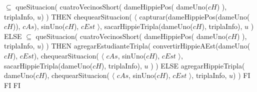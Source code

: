 \documentclass[8pt, a4paper]{article}
\begin{document}
\begin{tad}{}
{			{ $\subseteq$ queSituacion( cuatroVecinosShort( dameHippiePos( dameUno($cH$) ), triplaInfo, $u$) ) 
				THEN 
					chequearSituacion( 
						$\langle$ 
							capturar(dameHippiePos(dameUno($cH$)), $cAs$), 
							sinUno($cH$), 
							$cEst$ 
						$\rangle$, 
						sacarHippieTripla(dameUno($cH$), triplaInfo), 
						$u$
					)
				ELSE
					{ $\subseteq$ queSituacion( cuatroVecinosShort( dameHippiePos( dameUno($cH$) ), triplaInfo, $u$) ) 
						THEN
							agregarEstudianteTripla(
								convertirHippieAEst(dameUno($cH$), $cEst$), 
								chequearSituacion( 
									$\langle$ 
										$cAs$, 
										sinUno($cH$), 
										$cEst$  
									$\rangle$, 
									sacarHippieTripla(dameUno($cH$), triplaInfo), 
									$u$
								)
							)
						ELSE
							agregarHippieTripla( 
								dameUno($cH$), 
								chequearSituacion( 
									$\langle$ 
										$cAs$, 
										sinUno($cH$), 
										$cEst$  
									$\rangle$, 
								triplaInfo, 
								$u$) 
							)
					FI}
			FI}
	FI
}


			

\end{tad}
\end{document}
